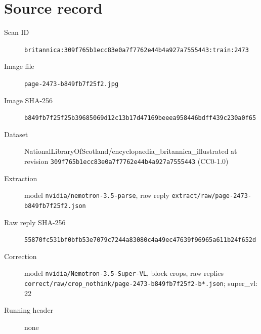 \documentclass{article}
\begin{document}
\section*{Source record}
\begin{description}
\item[Scan ID] \texttt{britannica:309f765b1ecc83e0a7f7762e44b4a927a7555443:train:2473}
\item[Image file] \texttt{page-2473-b849fb7f25f2.jpg}
\item[Image SHA-256] \texttt{b849fb7f25f25b39685069d12c13b17d47169beeea958446bdff439c230a0f65}
\item[Dataset] NationalLibraryOfScotland/encyclopaedia\_britannica\_illustrated at revision \texttt{309f765b1ecc83e0a7f7762e44b4a927a7555443} (CC0-1.0)
\item[Extraction] model \texttt{nvidia/nemotron-3.5-parse}, raw reply \texttt{extract/raw/page-2473-b849fb7f25f2.json}
\item[Raw reply SHA-256] \texttt{55870fc531bf0bfb53e7079c7244a83080c4a49ec47639f96965a611b24f652d}
\item[Correction] model \texttt{nvidia/Nemotron-3.5-Super-VL}, block crops, raw replies \texttt{correct/raw/crop\_nothink/page-2473-b849fb7f25f2-b*.json}; super\_vl: 22
\item[Running header] none
\end{description}
\end{document}
